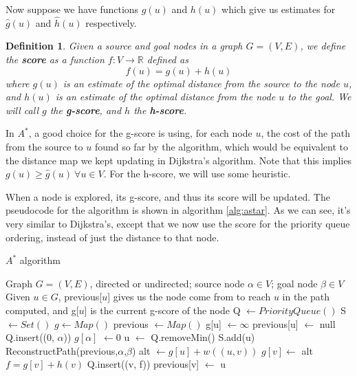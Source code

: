 \documentclass[12pt]{report}
\newtheorem{definition}[theorem]{Definition}
\begin{document}
Now suppose we have functions $g(u)$ and $h(u)$ which give us estimates for $\hat{g}(u)$ and $\hat{h}(u)$ respectively.

\begin{definition}
Given a source and goal nodes in a graph $G = (V, E)$, we define the \textbf{score} as a function $f \colon V \to \mathbb{R}$ defined as
\begin{equation}
	f(u) = g(u) + h(u)
\end{equation}
where $g(u)$ is an estimate of the optimal distance from the source to the node $u$, and $h(u)$ is an estimate of the optimal distance from the node $u$ to the goal.
We will call $g$ the \textbf{g-score}, and $h$ the \textbf{h-score}.
\end{definition}

In $A^*$, a good choice for the g-score is using, for each node $u$, the cost of the path from the source to $u$ found so far by the algorithm, which would be equivalent to the distance map we kept updating in Dijkstra's algorithm. Note that this implies $g(u) \geq \hat{g}(u) \ \forall u \in V$. For the h-score, we will use some heuristic.

When a node is explored, its g-score, and thus its score will be updated. The pseudocode for the algorithm is shown in algorithm \ref{alg:astar}. As we can see, it's very similar to Dijkstra's, except that we now use the score for the priority queue ordering, instead of just the distance to that node.

\begin{algorithm}
\caption{$A^*$ algorithm}
\label{alg:astar}
\begin{algorithmic}[1]
\Require Graph $G = (V, E)$, directed or undirected; source node $\alpha \in V$; goal node $\beta \in V$
\Ensure Given $u \in G$, previous[$u$] gives us the node come from to reach $u$ in the path computed, and g[$u$] is the current g-score of the node
\State Q $\gets PriorityQueue()$
\State S $\gets Set()$
\State $ g \gets Map()$
\State previous $\gets Map()$
	\State g[u] $\gets \infty$
	\State previous[u] $\gets$ null
\EndFor
\State Q.insert((0, $\alpha$))
\State $g[\alpha]$ $\gets 0$
	\State u $\gets$ Q.removeMin()
	\State S.add(u)
	 
		\State \Return ReconstructPath(previous,$\alpha$,$\beta$)
	\EndIf
			\Continue {}
		\EndIf
		\State alt $\gets g[u] + w((u, v))$
			\State $g[v] \gets$ alt 
			\State $f = g[v] + h(v)$
			\State Q.insert((v, f))
			\State previous[v] $\gets$ u
		\EndIf
	\EndFor
\EndWhile
\EndProcedure
\end{algorithmic}
\end{algorithm}
\end{document}
